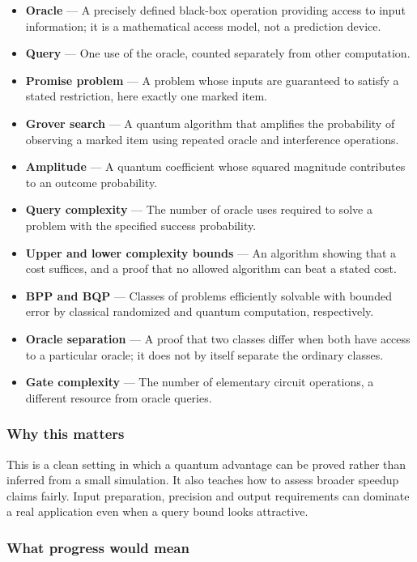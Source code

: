 \documentclass[
  11pt,
]{article}
\begin{document}
\begin{itemize}
\item
  \textbf{Oracle} --- A precisely defined black-box operation providing
  access to input information; it is a mathematical access model, not a
  prediction device.
\item
  \textbf{Query} --- One use of the oracle, counted separately from
  other computation.
\item
  \textbf{Promise problem} --- A problem whose inputs are guaranteed to
  satisfy a stated restriction, here exactly one marked item.
\item
  \textbf{Grover search} --- A quantum algorithm that amplifies the
  probability of observing a marked item using repeated oracle and
  interference operations.
\item
  \textbf{Amplitude} --- A quantum coefficient whose squared magnitude
  contributes to an outcome probability.
\item
  \textbf{Query complexity} --- The number of oracle uses required to
  solve a problem with the specified success probability.
\item
  \textbf{Upper and lower complexity bounds} --- An algorithm showing
  that a cost suffices, and a proof that no allowed algorithm can beat a
  stated cost.
\item
  \textbf{BPP and BQP} --- Classes of problems efficiently solvable with
  bounded error by classical randomized and quantum computation,
  respectively.
\item
  \textbf{Oracle separation} --- A proof that two classes differ when
  both have access to a particular oracle; it does not by itself
  separate the ordinary classes.
\item
  \textbf{Gate complexity} --- The number of elementary circuit
  operations, a different resource from oracle queries.
\end{itemize}

\subsubsection{Why this matters}

This is a clean setting in which a quantum advantage can be proved
rather than inferred from a small simulation. It also teaches how to
assess broader speedup claims fairly. Input preparation, precision and
output requirements can dominate a real application even when a query
bound looks attractive.

\subsubsection{What progress would mean}
\end{document}

